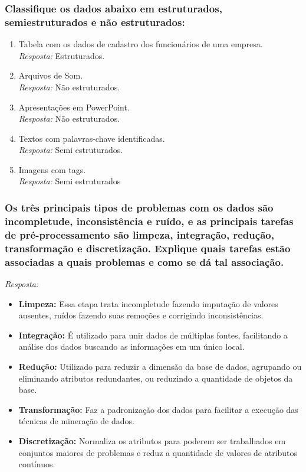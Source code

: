 \documentclass{article}
\begin{document}
\subsubsection{Classifique os dados abaixo em estruturados, semiestruturados e não estruturados:}
\begin{enumerate}[label=\alph*]
  \item Tabela com os dados de cadastro dos funcionários de uma empresa. \\
  \textit{Resposta:} Estruturados.
  \item Arquivos de Som. \\
  \textit{Resposta:} Não estruturados.
  \item Apresentações em PowerPoint. \\
  \textit{Resposta:} Não estruturados.
  \item Textos com palavras-chave identificadas. \\
  \textit{Resposta:} Semi estruturados.
  \item Imagens com tags. \\
  \textit{Resposta:} Semi estruturados
\end{enumerate}

\subsubsection{Os três principais tipos de problemas com os dados são incompletude, inconsistência e ruído, e as principais tarefas de pré-processamento são limpeza, integração, redução, transformação e discretização. Explique quais tarefas estão associadas a quais problemas e como se dá tal associação.} 
\textit{Resposta:} 
\begin{itemize}
  \item \textbf{Limpeza:} Essa etapa trata incompletude fazendo imputação de valores ausentes, ruídos fazendo suas remoções e corrigindo inconsistências.
  \item \textbf{Integração:} É utilizado para unir dados de múltiplas fontes, facilitando a análise dos dados buscando as informações em um único local.
  \item \textbf{Redução:} Utilizado para reduzir a dimensão da base de dados, agrupando ou eliminando atributos redundantes, ou reduzindo a quantidade de objetos da base. 
  \item \textbf{Transformação:} Faz a padronização dos dados para facilitar a execução das técnicas de mineração de dados.
  \item \textbf{Discretização:} Normaliza os atributos para poderem ser trabalhados em conjuntos maiores de problemas e reduz a quantidade de valores de atributos contínuos.

\end{itemize}
\end{document}
